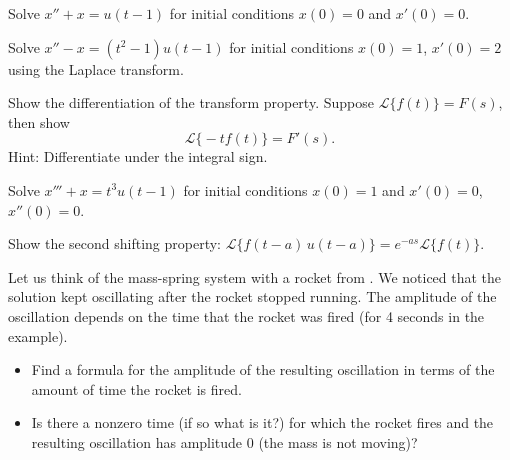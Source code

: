 \documentclass{ximera}
\begin{document}
\begin{exercise}
    Solve $x'' + x = u(t-1)$ for initial conditions $x(0) = 0$ and $x'(0) = 0$.
\end{exercise}

\begin{exercise}%
Solve $x''-x = (t^2-1) u(t-1)$ for initial conditions $x(0)=1$, $x'(0) = 2$ using the Laplace transform.
\end{exercise}
 

\begin{exercise}
    Show the differentiation of the transform property.  Suppose $\mathcal{L} \bigl\{ f(t) \bigr\} = F(s)$, then show
    \begin{equation*}
        \mathcal{L} \bigl\{ -t f(t) \bigr\} = F'(s) .
    \end{equation*}
    Hint: Differentiate under the integral sign.
\end{exercise}

\begin{exercise}
    Solve $x''' + x = t^3 u(t-1)$ for initial conditions $x(0) = 1$ and $x'(0) = 0$, $x''(0) = 0$.
\end{exercise}

\begin{exercise}
    Show the second shifting property: $\mathcal{L} \bigl\{ f(t-a) \, u(t-a) \bigr\} = e^{-as} \mathcal{L} \bigl\{ f(t) \bigr\}$.
\end{exercise}

\begin{exercise}
    Let us think of the mass-spring system with a rocket from .  We noticed that the solution kept oscillating after the rocket stopped running.  The amplitude of the oscillation depends on the time that the rocket was fired (for 4 seconds in the example). 
    \begin{itemize}
    \item Find a formula for the amplitude of the resulting oscillation in terms of the amount of time the rocket is fired.
    \item Is there a nonzero time (if so what is it?) for which the rocket fires and the resulting oscillation has amplitude 0 (the mass is not moving)?
    \end{itemize}
\end{exercise}
\end{document}
